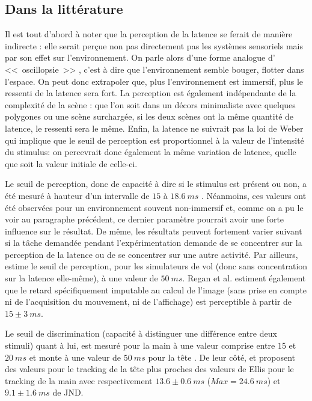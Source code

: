	\subsection{Dans la littérature}
	\par Il est tout d'abord à noter que la perception de la latence se ferait de manière indirecte \citep{adelstein_head_2003}: elle serait perçue non pas directement pas les systèmes sensoriels mais par son effet sur l'environnement. On parle alors d'une forme analogue d' <<~oscillopsie~>> \citep{allison_tolerance_2001}, c'est à dire que l'environnement semble bouger, flotter dans l'espace. On peut donc extrapoler que, plus l'environnement est immersif, plus le ressenti de la latence sera fort. La perception est également indépendante de la complexité de la scène \citep{mania_perceptual_2004}: que l'on soit dans un décors minimaliste avec quelques polygones ou une scène surchargée, si les deux scènes ont la même quantité de latence, le ressenti sera le même. Enfin, la latence ne suivrait pas la loi de Weber \citep{adelstein_head_2003} qui implique que le seuil de perception est proportionnel à la valeur de l'intensité du stimulus: on percevrait donc également la même variation de latence, quelle que soit la valeur initiale de celle-ci.
	
	\par Le seuil de perception, donc de capacité à dire si le stimulus est présent ou non, a été mesuré à hauteur d'un intervalle de $15$ à $18.6~ms$ \citep{regan_real-time_1999}. Néanmoins, ces valeurs ont été observées pour un environnement souvent non-immersif et, comme on a pu le voir au paragraphe précédent, ce dernier paramètre pourrait avoir une forte influence sur le résultat. De même, les résultats peuvent fortement varier suivant si la tâche demandée pendant l'expérimentation demande de se concentrer sur la perception de la latence ou de se concentrer sur une autre activité. Par ailleurs, \citep{brooks_whats_1999} estime le seuil de perception, pour les simulateurs de vol (donc sans concentration sur la latence elle-même), à une valeur de $50~ms$. Regan et al. estiment également que le retard spécifiquement imputable au calcul de l'image (sans prise en compte ni de l'acquisition du mouvement, ni de l'affichage) est perceptible à partir de $15 \pm 3~ms$.
	
	\par Le seuil de discrimination (capacité à distinguer une différence entre deux stimuli) quant à lui, est mesuré pour la main à une valeur comprise entre $15$ et $20~ms$ et monte à une valeur de $50~ms$ pour la tête \citep{ellis_sensor_1999}. De leur côté, \citep{adelstein_head_2003} et \citep{mania_perceptual_2004} proposent des valeurs pour le tracking de la tête plus proches des valeurs de Ellis pour le tracking de la main avec respectivement $13.6 \pm 0.6~ms$ ($Max = 24.6~ms$) et $9.1 \pm 1.6~ms$ de JND.
	

